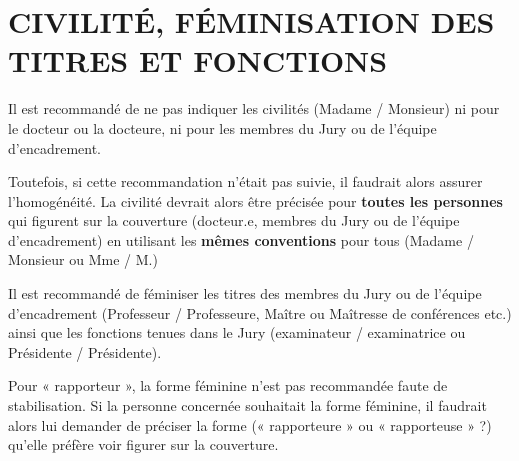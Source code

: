\documentclass[french,12pt,a4paper]{book}
\begin{document}
\chapter{CIVILITÉ, FÉMINISATION DES TITRES ET FONCTIONS}
Il est recommandé de ne pas indiquer les civilités (Madame / Monsieur) ni pour le docteur ou la docteure, ni pour les membres du Jury ou de l’équipe d’encadrement.\\ \par 
Toutefois, si cette recommandation n’était pas suivie, il faudrait alors assurer l’homogénéité. La civilité devrait alors être précisée pour \textbf{toutes les personnes} qui figurent sur la couverture (docteur.e, membres du Jury ou de l’équipe d’encadrement) en utilisant les \textbf{mêmes conventions} pour tous (Madame / Monsieur ou Mme / M.)\\ \par
Il est recommandé de féminiser les titres des membres du Jury ou de l’équipe d’encadrement (Professeur / Professeure, Maître ou Maîtresse de conférences etc.) ainsi que les fonctions tenues dans le Jury (examinateur / examinatrice ou Présidente / Présidente).\\ \par
Pour « rapporteur », la forme féminine n’est pas recommandée faute de stabilisation. Si la personne concernée souhaitait la forme féminine, il faudrait alors lui demander de préciser la forme (« rapporteure » ou « rapporteuse » ?) qu’elle préfère voir figurer sur la couverture.
\end{document}

